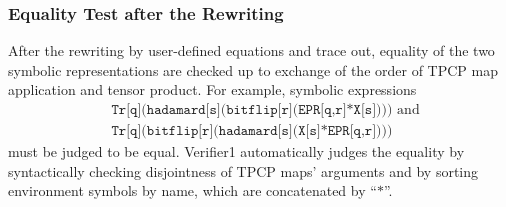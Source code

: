 \subsubsection{Equality Test after the Rewriting}
After the rewriting by
user-defined equations and trace out,
equality of the two symbolic representations are
checked up to exchange of the order of TPCP map application and
tensor product. For example, symbolic expressions
\begin{align*}
&\texttt{Tr[q](hadamard[s](bitflip[r](EPR[q,r]*X[s])))} \mbox{ and}\\
&\texttt{Tr[q](bitflip[r](hadamard[s](X[s]*EPR[q,r])))}
\end{align*}
must be judged to be equal.
Verifier1 automatically judges the equality by
syntactically checking disjointness of TPCP maps'
arguments and by sorting environment symbols by name, which are
concatenated by ``$\texttt{*}$''.

